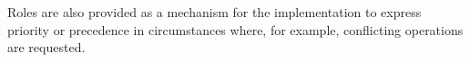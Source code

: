
%

Roles are also provided as a mechanism for the implementation to express priority or precedence in circumstances where, for example, conflicting operations are requested. 


